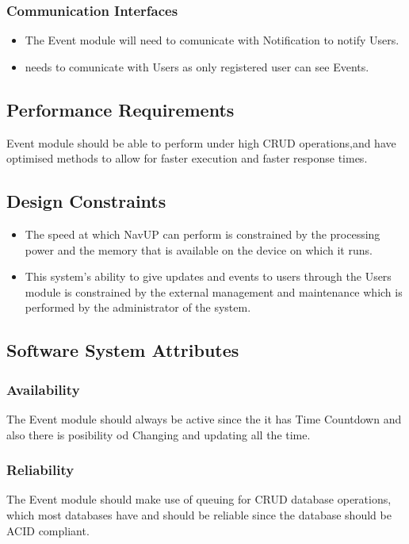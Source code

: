 	\subsubsection{Communication Interfaces } 
		\begin{itemize}
		\item The Event module will need to comunicate with Notification to notify Users.
		\item needs to comunicate with Users as only registered user can see Events.
		\end{itemize}

	
\subsection{Performance Requirements}
Event module should be able to perform under high CRUD operations,and have optimised methods to allow for faster execution and faster response times.


\subsection{Design Constraints}
\begin{itemize}

\item The speed at which NavUP can perform is constrained by the processing power and the  memory that is available on the device on which it runs.

\item This system’s ability to give updates and events to users through the Users module is constrained by the external management and maintenance which is performed by the administrator of the system.

\end{itemize}


\subsection{Software System Attributes} 
\subsubsection{Availability}
The Event module should always be active since the it has Time Countdown and also there is posibility od Changing and updating all the time. 
\subsubsection{Reliability}
The Event module should make use of queuing for CRUD database operations, which most databases have and should be reliable since the database should be ACID compliant.


